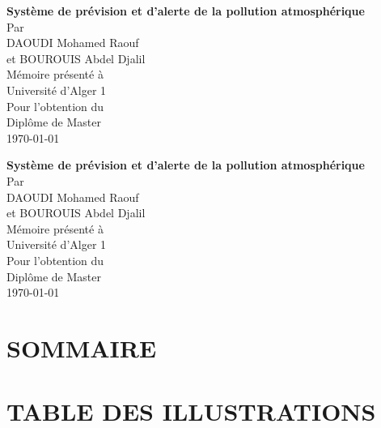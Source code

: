 \documentclass[12pt,a4paper]{report}
\begin{document}
\begin{titlepage}
\begin{center}
    \vspace*{2cm}
    {\LARGE\textbf{Système de prévision et d’alerte de la pollution atmosphérique}}\\[1cm]
    {\large Par}\\[0.5cm]
    {\large DAOUDI Mohamed Raouf}\\
    {\large et BOUROUIS Abdel Djalil}\\[1cm]
    {\large Mémoire présenté à}\\
    {\large Université d'Alger 1}\\[1cm]
    {\large Pour l'obtention du}\\
    {\large Diplôme de Master}\\[2cm]
    {\large \today}
\end{center}
\end{titlepage}

\newpage
\thispagestyle{empty}
\mbox{}

\newpage
\begin{titlepage}
\begin{center}
    \vspace*{2cm}
    {\LARGE\textbf{Système de prévision et d’alerte de la pollution atmosphérique}}\\[1cm]
    {\large Par}\\[0.5cm]
    {\large DAOUDI Mohamed Raouf}\\
    {\large et BOUROUIS Abdel Djalil}\\[1cm]
    {\large Mémoire présenté à}\\
    {\large Université d'Alger 1}\\[1cm]
    {\large Pour l'obtention du}\\
    {\large Diplôme de Master}\\[2cm]
    {\large \today}
\end{center}
\end{titlepage}

\newpage
{}
{}
\chapter*{SOMMAIRE}
\tableofcontents

\newpage
{}
{}
\chapter*{TABLE DES ILLUSTRATIONS}
\listoffigures
\end{document}

